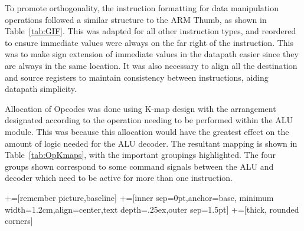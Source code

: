 To promote orthogonality, the instruction formatting for data manipulation operations followed a similar structure to the ARM Thumb, as shown in Table~\ref{tab:GIF}. 
This was adapted for all other instruction types, and reordered to ensure immediate values were always on the far right of the instruction. 
This was to make sign extension of immediate values in the datapath easier since they are always in the same location.
It was also necessary to align all the destination and source registers to maintain consistency between instructions, aiding datapath simplicity. 

Allocation of Opcodes was done using K-map design with the arrangement designated according to the operation needing to be performed within the ALU module. 
This was because this allocation would have the greatest effect on the amount of logic needed for the ALU decoder. 
The resultant mapping is shown in Table~\ref{tab:OpKmaps}, with the important groupings highlighted. 
The four groups shown correspond to some command signals between the ALU and decoder which need to be active for more than one instruction. 
\newcommand\tabnode[1]{\addtocounter{nodecount}{1} \tikz \node (\arabic{nodecount}) {#1};}

\newcommand\newcell[1]{\hspace{-0.5mm}\tabnode{#1}\hspace{-0.5mm}}

+=[remember picture,baseline]
+=[inner sep=0pt,anchor=base,
minimum width=1.2cm,align=center,text depth=.25ex,outer sep=1.5pt]
+=[thick, rounded corners]

\newcommand{\darkercolor}[3]{%
    \colorlet{#3}{#1!#2!black}
}
\darkercolor{green}{60}{darkgreen}

